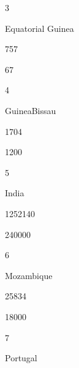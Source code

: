 \documentclass[letterpaper,10pt,english]{sphinxmanual}
\begin{document}
3





Equatorial Guinea





757





67









4





Guinea\sphinxhyphen{}Bissau





1704





1200









5





India





1252140





240000









6





Mozambique





25834





18000









7





Portugal
\end{document}

